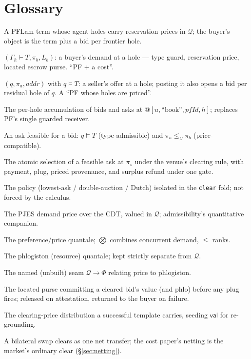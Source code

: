 \documentclass[11pt]{article}
\theoremstyle{definition}
\newcommand{\PF}{\textsf{PF}}
\newcommand{\CDT}{\textsf{CDT}}
\newcommand{\PFLam}{\textsf{PFLam}}
\newcommand{\val}{\ensuremath{\mathsf{val}}}
\newcommand{\price}{\ensuremath{\mathsf{price}}}
\newcommand{\Qval}{\mathcal{Q}}            %
\newcommand{\Phl}{\Phi}                     %
\newcommand{\modelsT}{\models}
\begin{document}
\section*{Glossary}
\begin{description}[leftmargin=5.5em,style=nextline,font=\normalfont\bfseries]
\item[priced \PF{}] A \PFLam{} term whose agent holes carry reservation prices in $\Qval$; the buyer's
object is the term plus a bid per frontier hole.
\item[bid] $(\Gamma_h\vdash T,\pi_b,L_b)$: a buyer's demand at a hole --- type guard, reservation
price, located escrow purse. ``\PF{} $+$ a cost''.
\item[ask] $(q,\pi_a,\mathit{addr})$ with $q\modelsT T$: a seller's offer at a hole; posting it also
opens a bid per residual hole of $q$. A ``\PF{} whose holes are priced''.
\item[order book] The per-hole accumulation of bids and asks at
$@[u,\text{``book''},pfId,h]$; replaces \PF{}'s single guarded receiver.
\item[feasible] An ask feasible for a bid: $q\modelsT T$ (type-admissible) and
$\pi_a\le_\Qval\pi_b$ (price-compatible).
\item[clear] The atomic selection of a feasible ask at $\pi_\star$ under the venue's clearing rule,
with payment, plug, priced provenance, and surplus refund under one gate.
\item[clearing rule] The policy (lowest-ask / double-auction / Dutch) isolated in the \texttt{clear}
fold; not forced by the calculus.
\item[$\val$ / $\price$] The PJES demand price over the \CDT{}, valued in $\Qval$; admissibility's
quantitative companion.
\item[$\Qval$] The preference/price quantale; $\bigotimes$ combines concurrent demand, $\le$ ranks.
\item[$\Phl$] The phlogiston (resource) quantale; kept strictly separate from $\Qval$.
\item[$\kappa$] The named (unbuilt) seam $\Qval\to\Phl$ relating price to phlogiston.
\item[escrow] The located purse committing a cleared bid's value (and phlo) before any plug fires;
released on attestation, returned to the buyer on failure.
\item[price prior] The clearing-price distribution a successful template carries, seeding $\val$ for
re-grounding.
\item[netting-as-clearing] A bilateral swap clears as one net transfer; the cost paper's netting is
the market's ordinary clear (\S\ref{sec:netting}).
\end{description}
\end{document}
